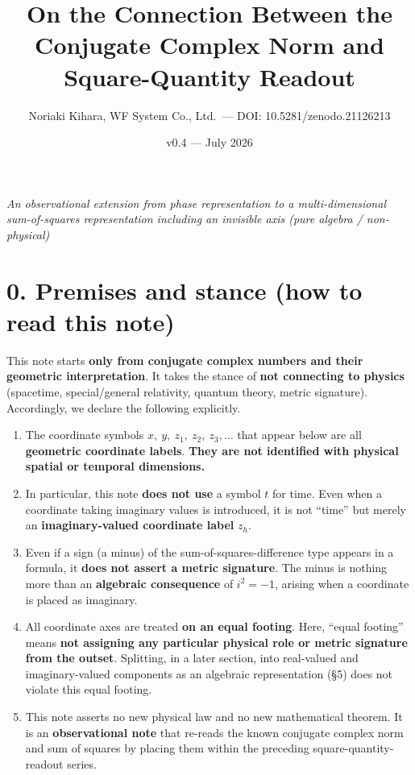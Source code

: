 \documentclass[11pt,a4paper]{article}
\title{On the Connection Between the Conjugate Complex Norm and
Square-Quantity Readout}
\author{Noriaki Kihara, WF System Co., Ltd.~--- DOI:
10.5281/zenodo.21126213}
\date{v0.4 --- July 2026}
\providecommand{\tightlist}{\setlength{\itemsep}{0pt}\setlength{\parskip}{0pt}}
\begin{document}
\maketitle
\emph{An observational extension from phase representation to a
multi-dimensional sum-of-squares representation including an invisible
axis (pure algebra / non-physical)}

\section{0. Premises and stance (how to read this
note)}\label{premises-and-stance-how-to-read-this-note}

This note starts \textbf{only from conjugate complex numbers and their
geometric interpretation}. It takes the stance of \textbf{not connecting
to physics} (spacetime, special/general relativity, quantum theory,
metric signature). Accordingly, we declare the following explicitly.

\begin{enumerate}
\def\labelenumi{\arabic{enumi}.}
\tightlist
\item
  The coordinate symbols \(x,\ y,\ z_1,\ z_2,\ z_3,\dots\) that appear
  below are all \textbf{geometric coordinate labels}. \textbf{They are
  not identified with physical spatial or temporal dimensions.}
\item
  In particular, this note \textbf{does not use} a symbol \(t\) for
  time. Even when a coordinate taking imaginary values is introduced, it
  is not ``time'' but merely an \textbf{imaginary-valued coordinate
  label} \(z_h\).
\item
  Even if a sign (a minus) of the sum-of-squares-difference type appears
  in a formula, it \textbf{does not assert a metric signature}. The
  minus is nothing more than an \textbf{algebraic consequence} of
  \(i^2=-1\), arising when a coordinate is placed as imaginary.
\item
  All coordinate axes are treated \textbf{on an equal footing}. Here,
  ``equal footing'' means \textbf{not assigning any particular physical
  role or metric signature from the outset}. Splitting, in a later
  section, into real-valued and imaginary-valued components as an
  algebraic representation (§5) does not violate this equal footing.
\item
  This note asserts no new physical law and no new mathematical theorem.
  It is an \textbf{observational note} that re-reads the known conjugate
  complex norm and sum of squares by placing them within the preceding
  square-quantity-readout series.
\end{enumerate}
\end{document}
